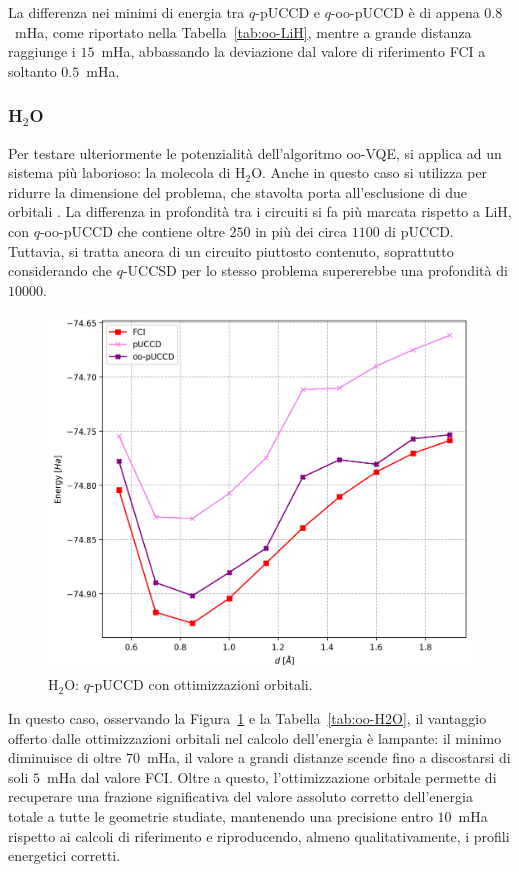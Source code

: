 

La differenza nei minimi di energia tra $q$-pUCCD e $q$-oo-pUCCD è di appena $0.8$~mHa, come riportato nella Tabella~\ref{tab:oo-LiH}, mentre a grande distanza raggiunge i $15$~mHa, abbassando la deviazione dal valore di riferimento FCI a soltanto $0.5$~mHa.


\subsubsection{H$_2$O}

Per testare ulteriormente le potenzialità dell'algoritmo oo-VQE, si applica ad un sistema più laborioso: la molecola di H$_2$O.
Anche in questo caso si utilizza  per ridurre la dimensione del problema, che stavolta porta all'esclusione di due orbitali . La differenza in profondità tra i circuiti si fa più marcata rispetto a LiH, con $q$-oo-pUCCD che contiene oltre $250$  in più dei circa $1100$ di pUCCD. Tuttavia, si tratta ancora di un circuito piuttosto contenuto, soprattutto considerando che $q$-UCCSD per lo stesso problema supererebbe una profondità di $10000$.

\begin{figure}[H]
    \centering
    \hspace{-1cm}
    \includegraphics[width=.6\linewidth]{Immagini/Capitolo_3/H2O_oo_pUCCD.png}
    \caption{H$_2$O: $q$-pUCCD con ottimizzazioni orbitali.}
    \label{fig:H2O-ottimizzazioni-orbitali}
\end{figure}



In questo caso, osservando la Figura~\ref{fig:H2O-ottimizzazioni-orbitali} e la Tabella~\ref{tab:oo-H2O}, il vantaggio offerto dalle ottimizzazioni orbitali nel calcolo dell'energia è lampante: il minimo diminuisce di oltre $70$~mHa, il valore a grandi distanze scende fino a discostarsi di soli $5$~mHa dal valore FCI. Oltre a questo, l’ottimizzazione orbitale permette di recuperare una frazione significativa del valore assoluto corretto dell’energia totale a tutte le geometrie studiate, mantenendo una precisione entro $10$~mHa rispetto ai calcoli di riferimento e riproducendo, almeno qualitativamente, i profili energetici corretti.

